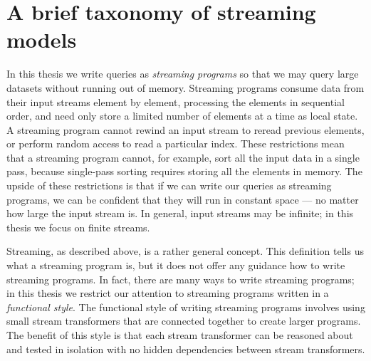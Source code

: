 \chapter{A brief taxonomy of streaming models}
\label{taxonomy}

In this thesis we write queries as \emph{streaming programs} so that we may query large datasets without running out of memory.
Streaming programs consume data from their input streams element by element, processing the elements in sequential order, and need only store a limited number of elements at a time as local state.
A streaming program cannot rewind an input stream to reread previous elements, or perform random access to read a particular index.
These restrictions mean that a streaming program cannot, for example, sort all the input data in a single pass, because single-pass sorting requires storing all the elements in memory.
The upside of these restrictions is that if we can write our queries as streaming programs, we can be confident that they will run in constant space --- no matter how large the input stream is.
In general, input streams may be infinite; in this thesis we focus on finite streams.


Streaming, as described above, is a rather general concept.
This definition tells us what a streaming program is, but it does not offer any guidance how to write streaming programs.
In fact, there are many ways to write streaming programs; in this thesis we restrict our attention to streaming programs written in a \emph{functional style}.
The functional style of writing streaming programs involves using small stream transformers that are connected together to create larger programs.
The benefit of this style is that each stream transformer can be reasoned about and tested in isolation with no hidden dependencies between stream transformers.

